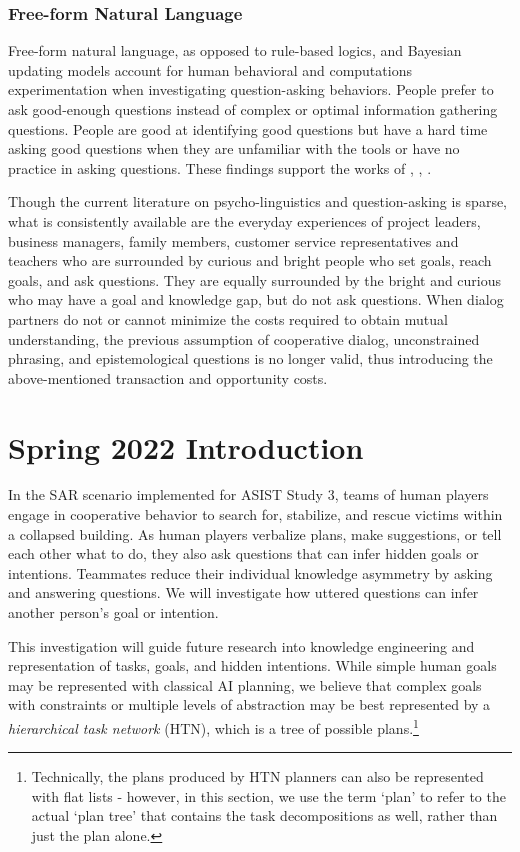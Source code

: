 \subsubsection{Free-form Natural Language}
Free-form natural language, as opposed to rule-based logics, and Bayesian updating models account for human behavioral and computations experimentation when investigating question-asking behaviors. People prefer to ask good-enough questions instead of complex or optimal information gathering questions. People are good at identifying good questions but have a hard time asking good questions \citet{rothe_lake_gureckis_2018} when they are unfamiliar with the tools or have no practice in asking questions. These findings support the works of \citet{alaimi_2020}, \citet{hawkins_goodman_2017}, \citet{ray_2001}.

Though the current literature on psycho-linguistics and question-asking is sparse, what is consistently available are the everyday experiences of project leaders, business managers, family members, customer service representatives and teachers who are surrounded by curious and bright people who set goals, reach goals, and ask questions. They are equally surrounded by the bright and curious who may have a goal and knowledge gap, but do not ask questions. When dialog partners do not or cannot minimize the costs required to obtain mutual understanding, the previous assumption of cooperative dialog, unconstrained phrasing, and epistemological questions is no longer valid, thus introducing the above-mentioned transaction and opportunity costs.





\section{Spring 2022 Introduction}

In the SAR scenario implemented for ASIST Study 3, teams of human players
engage in cooperative behavior to search for, stabilize, and rescue victims
within a collapsed building. As human players verbalize plans, make
suggestions, or tell each other what to do, they also ask questions that can
infer hidden goals or intentions. Teammates reduce their individual knowledge
asymmetry by asking and answering questions.  We will investigate how uttered
questions can infer another person's goal or intention. 

This investigation will guide future research into knowledge engineering and
representation of tasks, goals, and hidden intentions. While simple human goals
may be represented with classical AI planning, we believe that complex goals with 
constraints or multiple levels of abstraction may be best
represented by a \emph{hierarchical task network} (HTN), which is a tree of possible
plans.\footnote{Technically, the plans produced by HTN planners can also be
    represented with flat lists - however, in this section, we use the term
`plan' to refer to the actual `plan tree' that contains the task decompositions
as well, rather than just the plan alone.}

